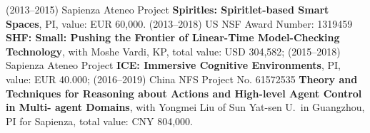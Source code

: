 (2013--2015) Sapienza Ateneo Project \textbf{Spiritles: Spiritlet-based Smart Spaces}, PI, value: EUR 60,000.
(2013--2018) US NSF Award Number: 1319459 \textbf{SHF: Small: Pushing the Frontier of Linear-Time Model-Checking Technology}, with Moshe Vardi, KP, total  value: USD 304,582;
(2015--2018)  Sapienza Ateneo Project \textbf{ICE: Immersive Cognitive Environments}, PI, value: EUR 40.000;
(2016--2019) China NFS Project %
No. 61572535 \textbf{Theory and Techniques for Reasoning about Actions and High-level Agent Control in Multi- agent Domains}, with Yongmei Liu of Sun Yat-sen U.\ in Guangzhou, PI for Sapienza, total value: CNY 804,000.





